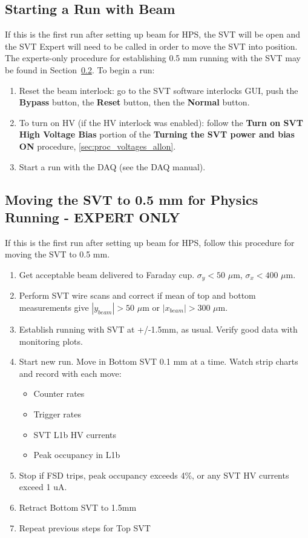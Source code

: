 \documentclass[12pt]{report}
\begin{document}
\subsection{Starting a Run with Beam}
\label{sec:proc_general_startrun}
If this is the first run after setting up beam for HPS, the SVT will be open and the SVT Expert will need to be called in order to move the SVT into position. The experts-only procedure for establishing 0.5 mm running with the SVT may be found in Section~\ref{sec:proc_svt_0.5mm}.  To begin a run:
\begin{enumerate}
\item Reset the beam interlock: go to the SVT software interlocks GUI, push the \textbf{Bypass} button, the \textbf{Reset} button, then the \textbf{Normal} button.
\item To turn on HV (if the HV interlock was enabled): follow the \textbf{Turn on SVT High Voltage Bias} portion of the \textbf{Turning the SVT power and bias ON} procedure, \ref{sec:proc_voltages_allon}.
\item Start a run with the DAQ (see the DAQ manual).
\end{enumerate}

\subsection{Moving the SVT to 0.5 mm for Physics Running - \textbf{EXPERT ONLY}}
\label{sec:proc_svt_0.5mm}

If this is the first run after setting up beam for HPS, follow this procedure for moving the SVT to 0.5 mm.
\begin{enumerate}
\item Get acceptable beam delivered to Faraday cup.  $\sigma_y < 50$ $\mu$m, $\sigma_x < 400$ $\mu$m.
\item Perform SVT wire scans and correct if mean of top and bottom measurements give $|y_{beam}| > 50$ $\mu$m or $|x_{beam}| > 300$ $\mu$m. 
\item Establish running with SVT at +/-1.5mm, as usual.  Verify good data with monitoring plots.
\item Start new run.  Move in Bottom SVT 0.1 mm at a time.  Watch strip charts and record with each move:
\begin{itemize}
\item Counter rates
\item Trigger rates
\item SVT L1b HV currents
\item Peak occupancy in L1b
\end{itemize}
\item Stop if FSD trips, peak occupancy exceeds 4\%, or any SVT HV currents exceed 1 uA.
\item Retract Bottom SVT to 1.5mm
\item Repeat previous steps for Top SVT
\end{enumerate}
\end{document}
